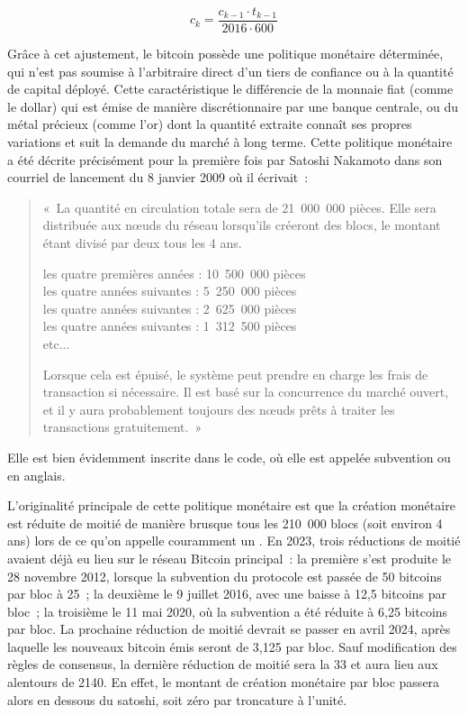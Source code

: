 { \small
\[
c_{k} = \frac{c_{k-1} \cdot t_{k-1}}{2016 \cdot 600}
\]
}

Grâce à cet ajustement, le bitcoin possède une politique monétaire déterminée, qui n'est pas soumise à l'arbitraire direct d'un tiers de confiance ou à la quantité de capital déployé. Cette caractéristique le différencie de la monnaie fiat (comme le dollar) qui est émise de manière discrétionnaire par une banque centrale, ou du métal précieux (comme l'or) dont la quantité extraite connaît ses propres variations et suit la demande du marché à long terme. Cette politique monétaire a été décrite précisément pour la première fois par Satoshi Nakamoto dans son courriel de lancement du 8 janvier 2009 où il écrivait~:

\begin{quote}
«~La quantité en circulation totale sera de 21~000~000 pièces. Elle sera distribuée aux nœuds du réseau lorsqu'ils créeront des blocs, le montant étant divisé par deux tous les 4 ans.

les quatre premières années : 10~500~000 pièces\\
les quatre années suivantes : 5~250~000 pièces\\
les quatre années suivantes : 2~625~000 pièces\\
les quatre années suivantes : 1~312~500 pièces\\
etc...

Lorsque cela est épuisé, le système peut prendre en charge les frais de transaction si nécessaire. Il est basé sur la concurrence du marché ouvert, et il y aura probablement toujours des nœuds prêts à traiter les transactions gratuitement.~»
\end{quote}

Elle est bien évidemment inscrite dans le code, où elle est appelée subvention ou  en anglais.

L'originalité principale de cette politique monétaire est que la création monétaire est réduite de moitié de manière brusque tous les 210~000 blocs (soit environ 4 ans) lors de ce qu'on appelle couramment un . En 2023, trois réductions de moitié avaient déjà eu lieu sur le réseau Bitcoin principal~: la première s'est produite le 28 novembre 2012, lorsque la subvention du protocole est passée de 50 bitcoins par bloc à 25~; la deuxième le 9 juillet 2016, avec une baisse à 12,5 bitcoins par bloc~; la troisième le 11 mai 2020, où la subvention a été réduite à 6,25 bitcoins par bloc. La prochaine réduction de moitié devrait se passer en avril 2024, après laquelle les nouveaux bitcoin émis seront de 3,125 par bloc. Sauf modification des règles de consensus, la dernière réduction de moitié sera la 33\ieme{} et aura lieu aux alentours de 2140. En effet, le montant de création monétaire par bloc passera alors en dessous du satoshi, soit zéro par troncature à l'unité.

